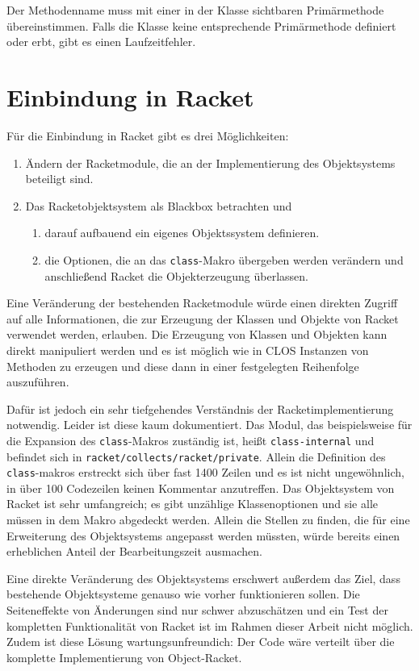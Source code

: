 Der Methodenname muss mit einer in der Klasse sichtbaren Primärmethode übereinstimmen. Falls die Klasse keine entsprechende Primärmethode definiert oder erbt, gibt es einen Laufzeitfehler.

\section{Einbindung in Racket}
Für die Einbindung in Racket gibt es drei Möglichkeiten:
\begin{enumerate}
 \item Ändern der Racketmodule, die an der Implementierung des Objektsystems beteiligt sind.
 \item Das Racketobjektsystem als Blackbox betrachten und 
 \begin{enumerate}
  \item darauf aufbauend ein eigenes Objektssystem definieren.
  \item die Optionen, die an das \texttt{class}-Makro übergeben werden verändern und anschließend Racket die Objekterzeugung überlassen.
 \end{enumerate}
\end{enumerate}

Eine Veränderung der bestehenden Racketmodule würde einen direkten Zugriff auf alle Informationen, die zur Erzeugung der Klassen und Objekte von Racket verwendet werden, erlauben. Die Erzeugung von Klassen und Objekten kann direkt manipuliert werden und es ist möglich wie in CLOS Instanzen von Methoden zu erzeugen und diese dann in einer festgelegten Reihenfolge auszuführen. 

Dafür ist jedoch ein sehr tiefgehendes Verständnis der Racketimplementierung notwendig. Leider ist diese kaum dokumentiert. Das Modul, das beispielsweise für die Expansion des \texttt{class}-Makros zuständig ist, heißt \texttt{class-internal} und befindet sich in \texttt{racket/collects/racket/private}. Allein die Definition des \texttt{class}-makros erstreckt sich über fast 1400 Zeilen und es ist nicht ungewöhnlich, in über 100 Codezeilen keinen Kommentar anzutreffen. Das Objektsystem von Racket ist sehr umfangreich; es gibt unzählige Klassenoptionen und sie alle müssen in dem Makro abgedeckt werden. Allein die Stellen zu finden, die für eine Erweiterung des Objektsystems angepasst werden müssten, würde bereits einen erheblichen Anteil der Bearbeitungszeit ausmachen.

Eine direkte Veränderung des Objektsystems erschwert außerdem das Ziel, dass bestehende Objektsysteme genauso wie vorher funktionieren sollen. Die Seiteneffekte von Änderungen sind nur schwer abzuschätzen und ein Test der kompletten Funktionalität von Racket ist im Rahmen dieser Arbeit nicht möglich. Zudem ist diese Lösung wartungsunfreundich: Der Code wäre verteilt über die komplette Implementierung von Object-Racket. 

